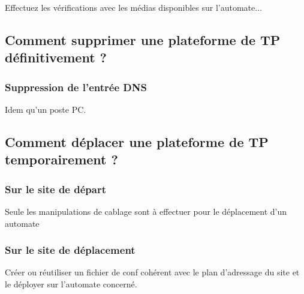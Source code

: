 \documentclass[a4paper]{article}
\begin{document}
Effectuez les vérifications avec les médias disponibles sur l'automate...

\subsection{Comment supprimer une plateforme de TP définitivement ?}

\subsubsection{Suppression de l'entrée DNS}

Idem qu'un poste PC.

\subsection{Comment déplacer une plateforme de TP temporairement ?}

\subsubsection{Sur le site de départ}

Seule les manipulations de cablage sont à effectuer pour le déplacement d'un automate

\subsubsection{Sur le site de déplacement}

Créer ou réutiliser un fichier de conf cohérent avec le plan d'adressage du site et le déployer sur l'automate concerné.
\end{document}
